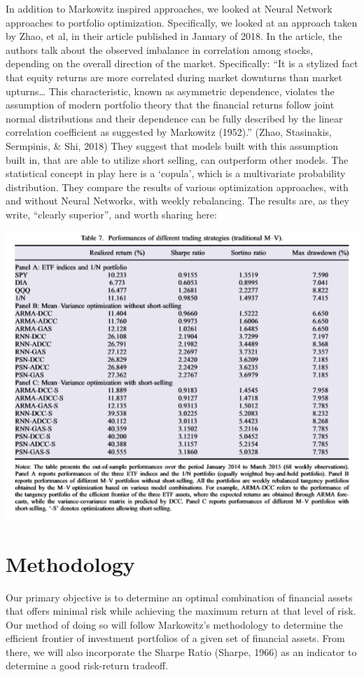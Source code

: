 \documentclass[11pt]{article} %
\begin{document}
In addition to Markowitz inspired approaches, we looked at Neural Network approaches to portfolio optimization. Specifically, we looked at an approach taken by Zhao, et al, in their article published in January of 2018. In the article, the authors talk about the observed imbalance in correlation among stocks, depending on the overall direction of the market. Specifically: ``It is a stylized fact that equity returns are more correlated during market downturns than market upturns… This characteristic, known as asymmetric dependence, violates the assumption of modern portfolio theory that the financial returns follow joint normal distributions and their dependence can be fully described by the linear correlation coefficient as suggested by Markowitz (1952).” (Zhao, Stasinakis, Sermpinis, \& Shi, 2018) They suggest that models built with this assumption built in, that are able to utilize short selling, can outperform other models. The statistical concept in play here is a ‘copula’, which is a multivariate probability distribution. They compare the results of various optimization approaches, with and without Neural Networks, with weekly rebalancing. The results are, as they write, ``clearly superior”, and worth sharing here:

\includegraphics[width=\textwidth]{table1}

 
\section{Methodology}

Our primary objective is to determine an optimal combination of financial assets that offers minimal risk while achieving the maximum return at that level of risk. Our method of doing so will follow Markowitz’s methodology to determine the efficient frontier of investment portfolios of a given set of financial assets. From there, we will also incorporate the Sharpe Ratio (Sharpe, 1966) as an indicator to determine a good risk-return tradeoff.
\end{document}

